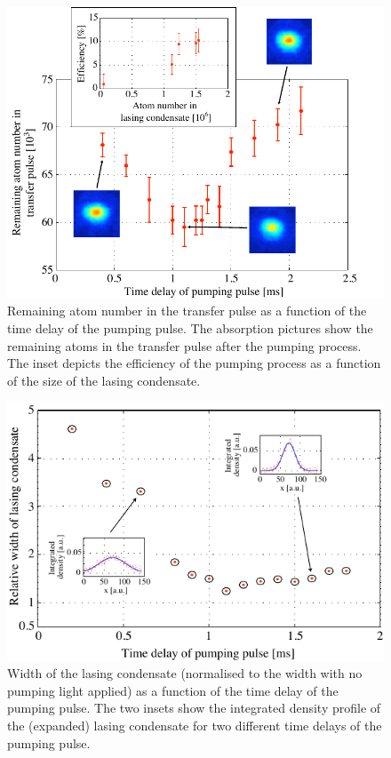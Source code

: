 \begin{figure}
    \centering
    \includegraphics[width=12cm]{PulsedPumpingExperimentalTransfer}
    \caption{Remaining atom number in the transfer pulse as a function of the time delay of the pumping pulse.  The absorption pictures show the remaining atoms in the transfer pulse after the pumping process.  The inset depicts the efficiency of the pumping process as a function of the size of the lasing condensate.}
    \label{OpticalPumping:PulsedPumpingExperimentalTransfer}
\end{figure}

\begin{figure}
    \centering
    \includegraphics[width=12cm]{PulsedPumpingExperimentalHeating}
    \caption{Width of the lasing condensate (normalised to the width with no pumping light applied) as a function of the time delay of the pumping pulse.  The two insets show the integrated density profile of the (expanded) lasing condensate for two different time delays of the pumping pulse.}
    \label{OpticalPumping:PulsedPumpingExperimentalHeating}
\end{figure}

